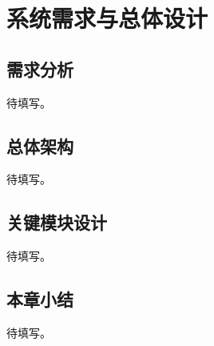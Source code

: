 \chapter{系统需求与总体设计}

\section{需求分析}
待填写。

\section{总体架构}
待填写。

\section{关键模块设计}
待填写。

\section{本章小结}
待填写。

